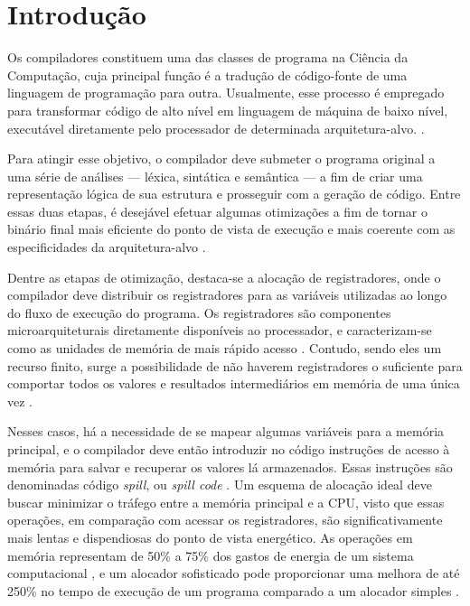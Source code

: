 \documentclass[
	12pt,				%
	openright,			%
	oneside,			%
	a4paper,			%
	tccpreliminar,			%
	]{ABNT-DC-UEL}
\begin{document}
\tableofcontents*
\cleardoublepage



\textual
\pagestyle{dc-uel-header} %


\chapter{Introdução}
Os compiladores constituem uma das classes de programa na Ciência da Computação, cuja principal função é a tradução de código-fonte de uma linguagem de programação para outra. Usualmente, esse processo é empregado para transformar código de alto nível em linguagem de máquina de baixo nível, executável diretamente pelo processador de determinada arquitetura-alvo. \cite{aho:07}.

Para atingir esse objetivo, o compilador deve submeter o programa original a uma série de análises --- léxica, sintática e semântica --- a fim de criar uma representação lógica de sua estrutura e prosseguir com a geração de código. Entre essas duas etapas, é desejável efetuar algumas otimizações a fim de tornar o binário final mais eficiente do ponto de vista de execução e mais coerente com as especificidades da arquitetura-alvo \cite{muchnick:97}.

Dentre as etapas de otimização, destaca-se a alocação de registradores, onde o compilador deve distribuir os registradores para as variáveis utilizadas ao longo do fluxo de execução do programa. Os registradores são componentes microarquiteturais diretamente disponíveis ao processador, e caracterizam-se como as unidades de memória de mais rápido acesso \cite{mittal:16}. Contudo, sendo eles um recurso finito, surge a possibilidade de não haverem registradores o suficiente para comportar todos os valores e resultados intermediários em memória de uma única vez \cite{aho:07}.

Nesses casos, há a necessidade de se mapear algumas variáveis para a memória principal, e o compilador deve então introduzir no código instruções de acesso à memória para salvar e recuperar os valores lá armazenados. Essas instruções são denominadas código \textit{spill}, ou \textit{spill code} \cite{briggs:92}. Um esquema de alocação ideal deve buscar minimizar o tráfego entre a memória principal e a CPU, visto que essas operações, em comparação com acessar os registradores, são significativamente mais lentas e dispendiosas do ponto de vista energético. As operações em memória representam de 50\% a 75\% dos gastos de energia de um sistema computacional \cite{verma:06}, e um alocador sofisticado pode proporcionar uma melhora de até 250\% no tempo de execução de um programa comparado a um alocador simples \cite{pereira:08}.
\end{document}
